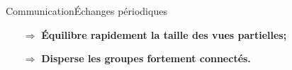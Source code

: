 \begin{frame}{Communication}{Échanges périodiques}


  \vspace{0.5cm}
  \large
  \begin{itemize}
  \item [$\Rightarrow$] \textbf{Équilibre rapidement la taille des vues
      partielles;}
  \item [$\Rightarrow$] \textbf{Disperse les groupes fortement connectés.}
  \end{itemize}
  
\end{frame}

